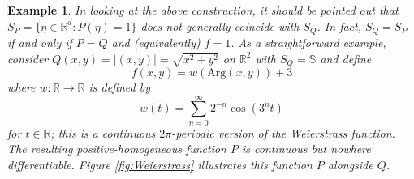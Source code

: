 \documentclass[11pt]{article}
\newtheorem{example}{Example}
\theoremstyle{remark}
\newcommand{\lp}{\left(}
\newcommand{\rp}{\right)}
\begin{document}
\begin{example}
\noindent In looking at the above construction, it should be pointed out that $S_P=\{\eta\in\mathbb{R}^d:P(\eta)=1\}$ does not generally coincide with $S_Q$. In fact, $S_Q=S_P$ if and only if $P=Q$ and (equivalently) $f=1$. As a straightforward example, consider $Q(x,y)=|(x,y)|=\sqrt{x^2+y^2}$ on $\mathbb{R}^2$ with $S_Q=\mathbb{S}$ and define
\begin{equation*}
f(x,y)=w(\mbox{Arg}(x,y))+3
\end{equation*}
where $w:\mathbb{R}\to\mathbb{R}$ is defined by
\begin{equation*}
    w(t) = \sum_{n=0}^\infty 2^{-n} \cos\lp 3^n t \rp
\end{equation*}
for $t\in\mathbb{R}$; this is a continuous $2\pi$-periodic version of the Weierstrass function. The resulting positive-homogeneous function $P$ is continuous but nowhere differentiable. Figure \ref{fig:Weierstrass} illustrates this function $P$ alongside $Q$.



\end{example}
\end{document}
